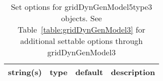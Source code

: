\begin{table}[ht]
\centering
\begin{tabular}{p{5cm} c c p{7cm}}
\hline
string(s) & type & default & description \\
\hline
\hline
\end{tabular}
\caption{Set options for gridDynGenModel5type3 objects. See Table~\ref{table:gridDynGenModel3} for additional settable options through gridDynGenModel3}
\label{table:gridDynGenModel5type3}
\end{table}
